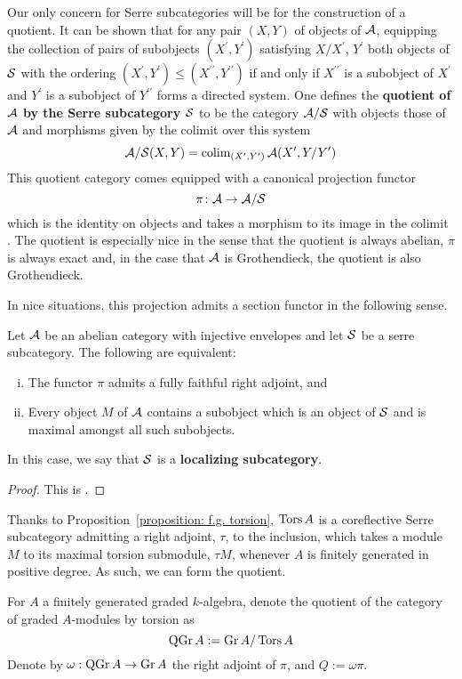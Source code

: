 Our only concern for Serre subcategories will be for the construction of a quotient.
It can be shown that for any pair \((X,Y)\) of objects of \(\mathcal{A}\), equipping the collection of pairs of subobjects \((X^\prime, Y^\prime)\) satisfying \(X/X^\prime\), \(Y^\prime\) both objects of \(\mathcal{S}\) with the ordering \((X^\prime, Y^\prime) \leq (X^{\prime\prime}, Y^{\prime\prime})\) if and only if \(X^{\prime\prime}\) is a subobject of \(X^\prime\) and \(Y^\prime\) is a subobject of \(Y^{\prime\prime}\) forms a directed system.
One defines the \textbf{quotient of \(\mathcal{A}\) by the Serre subcategory \(\mathcal{S}\)} to be the category \(\mathcal{A}/\mathcal{S}\) with objects those of \(\mathcal{A}\) and morphisms given by the colimit over this system
\[\mathcal{A}/\mathcal{S}(X,Y) = \operatorname{colim}_{(X^\prime, Y^\prime)} \mathcal{A}(X^\prime, Y/Y^\prime)\]
This quotient category comes equipped with a canonical projection functor
\[\pi \colon \mathcal{A} \to \mathcal{A}/\mathcal{S}\]
which is the identity on objects and takes a morphism to its image in the colimit \parencite[Cor. 1, III.1]{DCA62}.
The quotient is especially nice in the sense that the quotient is always abelian, \(\pi\) is always exact and, in the case that \(\mathcal{A}\) is Grothendieck, the quotient is also Grothendieck.

In nice situations, this projection admits a section functor in the following sense.

\begin{proposition}\label{prop: existence of serre functor}
  Let \(\mathcal{A}\) be an abelian category with injective envelopes and let \(\mathcal{S}\) be a serre subcategory.
  The following are equivalent:
  \begin{enumerate}[(i)]
  \item
    The functor \(\pi\) admits a fully faithful right adjoint, and
  \item
    Every object \(M\) of \(\mathcal{A}\) contains a subobject which is an object of \(\mathcal{S}\) and is maximal amongst all such subobjects.
  \end{enumerate}
  In this case, we say that \(\mathcal{S}\) is a \textbf{localizing subcategory}.
\end{proposition}

\begin{proof}
  This is \parencite[Cor. 1, III.3]{DCA62}.
\end{proof}

Thanks to Proposition~\ref{proposition: f.g. torsion}, \(\operatorname{Tors}A\) is a coreflective Serre subcategory admitting a right adjoint, \(\tau\), to the inclusion, which takes a module \(M\) to its maximal torsion submodule, \(\tau{M}\), whenever \(A\) is finitely generated in positive degree.
As such, we can form the quotient.
\begin{definition}
  For \(A\) a finitely generated graded \(k\)-algebra, denote the quotient of the category of graded \(A\)-modules by torsion as
  \begin{displaymath}
    \operatorname{QGr}A := \operatorname{Gr}A / \operatorname{Tors}A
  \end{displaymath}
  Denote by \(\omega : \operatorname{QGr}A \to \operatorname{Gr}A\) the right adjoint of \(\pi\), and \(Q := \omega\pi\).
\end{definition}

